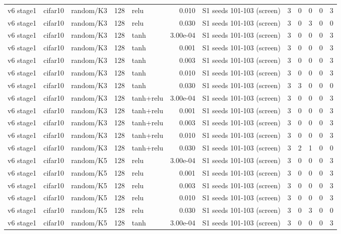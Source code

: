 \begin{table}[htbp]
{\begin{tabular}{@{}lllrlrlrrrrr@{}}
v6 stage1 & cifar10 & random/K3 & 128 & relu & 0.010 & S1 seeds 101-103 (screen) & 3 & 0 & 0 & 0 & 3 \\
v6 stage1 & cifar10 & random/K3 & 128 & relu & 0.030 & S1 seeds 101-103 (screen) & 3 & 0 & 3 & 0 & 0 \\
v6 stage1 & cifar10 & random/K3 & 128 & tanh & 3.00e-04 & S1 seeds 101-103 (screen) & 3 & 0 & 0 & 0 & 3 \\
v6 stage1 & cifar10 & random/K3 & 128 & tanh & 0.001 & S1 seeds 101-103 (screen) & 3 & 0 & 0 & 0 & 3 \\
v6 stage1 & cifar10 & random/K3 & 128 & tanh & 0.003 & S1 seeds 101-103 (screen) & 3 & 0 & 0 & 0 & 3 \\
v6 stage1 & cifar10 & random/K3 & 128 & tanh & 0.010 & S1 seeds 101-103 (screen) & 3 & 0 & 0 & 0 & 3 \\
v6 stage1 & cifar10 & random/K3 & 128 & tanh & 0.030 & S1 seeds 101-103 (screen) & 3 & 3 & 0 & 0 & 0 \\
v6 stage1 & cifar10 & random/K3 & 128 & tanh+relu & 3.00e-04 & S1 seeds 101-103 (screen) & 3 & 0 & 0 & 0 & 3 \\
v6 stage1 & cifar10 & random/K3 & 128 & tanh+relu & 0.001 & S1 seeds 101-103 (screen) & 3 & 0 & 0 & 0 & 3 \\
v6 stage1 & cifar10 & random/K3 & 128 & tanh+relu & 0.003 & S1 seeds 101-103 (screen) & 3 & 0 & 0 & 0 & 3 \\
v6 stage1 & cifar10 & random/K3 & 128 & tanh+relu & 0.010 & S1 seeds 101-103 (screen) & 3 & 0 & 0 & 0 & 3 \\
v6 stage1 & cifar10 & random/K3 & 128 & tanh+relu & 0.030 & S1 seeds 101-103 (screen) & 3 & 2 & 1 & 0 & 0 \\
v6 stage1 & cifar10 & random/K5 & 128 & relu & 3.00e-04 & S1 seeds 101-103 (screen) & 3 & 0 & 0 & 0 & 3 \\
v6 stage1 & cifar10 & random/K5 & 128 & relu & 0.001 & S1 seeds 101-103 (screen) & 3 & 0 & 0 & 0 & 3 \\
v6 stage1 & cifar10 & random/K5 & 128 & relu & 0.003 & S1 seeds 101-103 (screen) & 3 & 0 & 0 & 0 & 3 \\
v6 stage1 & cifar10 & random/K5 & 128 & relu & 0.010 & S1 seeds 101-103 (screen) & 3 & 0 & 0 & 0 & 3 \\
v6 stage1 & cifar10 & random/K5 & 128 & relu & 0.030 & S1 seeds 101-103 (screen) & 3 & 0 & 3 & 0 & 0 \\
v6 stage1 & cifar10 & random/K5 & 128 & tanh & 3.00e-04 & S1 seeds 101-103 (screen) & 3 & 0 & 0 & 0 & 3 \\

\end{tabular}}
\end{table}

